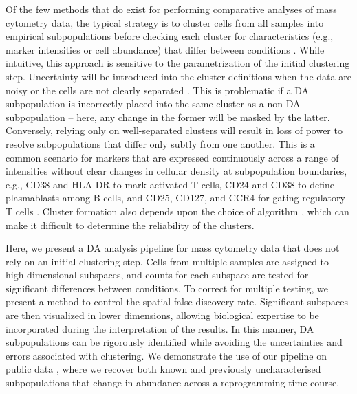 \documentclass{article}
\begin{document}
Of the few methods that do exist for performing comparative analyses of mass cytometry data, the typical strategy is to cluster cells from all samples into empirical subpopulations before checking each cluster for characteristics (e.g., marker intensities or cell abundance) that differ between conditions \cite{anchang2016visualization,bruggner2014automated}.
While intuitive, this approach is sensitive to the parametrization of the initial clustering step.
Uncertainty will be introduced into the cluster definitions when the data are noisy or the cells are not clearly separated \cite{suzuki2006pvclust,kerr2001bootstrapping}.
This is problematic if a DA subpopulation is incorrectly placed into the same cluster as a non-DA subpopulation -- here, any change in the former will be masked by the latter.
Conversely, relying only on well-separated clusters will result in loss of power to resolve subpopulations that differ only subtly from one another.
This is a common scenario for markers that are expressed continuously across a range of intensities without clear changes in cellular density at subpopulation boundaries, e.g., CD38 and HLA-DR to mark activated T cells, CD24 and CD38 to define plasmablasts among B cells, and CD25, CD127, and CCR4 for gating regulatory T cells \cite{finak2016standardizing}.
Cluster formation also depends upon the choice of algorithm \cite{datta2003comparisons,wiwie2015comparing}, which can make it difficult to determine the reliability of the clusters.


Here, we present a DA analysis pipeline for mass cytometry data that does not rely on an initial clustering step.
Cells from multiple samples are assigned to high-dimensional subspaces, and counts for each subspace are tested for significant differences between conditions.
To correct for multiple testing, we present a method to control the spatial false discovery rate.
Significant subspaces are then visualized in lower dimensions, allowing biological expertise to be incorporated during the interpretation of the results.
In this manner, DA subpopulations can be rigorously identified while avoiding the uncertainties and errors associated with clustering.
We demonstrate the use of our pipeline on public data \cite{zunder2015continuous}, where we recover both known and previously uncharacterised subpopulations that change in abundance across a reprogramming time course.
\end{document}
